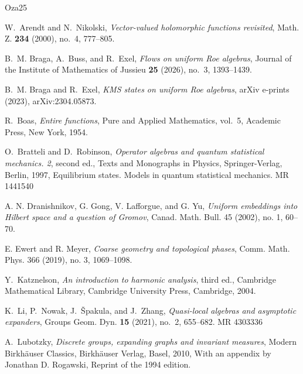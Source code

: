 \documentclass[11pt]{amsart}
\numberwithin{equation}{section}
\theoremstyle{definition}
\theoremstyle{remark}
\begin{document}
\providecommand{\bysame}{\leavevmode\hbox to3em{\hrulefill}\thinspace}
\providecommand{\MR}{\relax\ifhmode\unskip\space\fi MR }
\providecommand{\MRhref}[2]{%
  \href{http://www.ams.org/mathscinet-getitem?mr=#1}{#2}
}
\providecommand{\href}[2]{#2}
\begin{thebibliography}{{Oza}25}

W.~Arendt and N.~Nikolski, \emph{Vector-valued holomorphic functions
  revisited}, Math. Z. \textbf{234} (2000), no.~4, 777--805.

B.~M. Braga, A.~Buss, and R.~Exel, \emph{Flows on uniform {R}oe algebras},
  Journal of the Institute of Mathematics of Jussieu \textbf{25} (2026), no.~3,
  1393--1439.

B.~M. {Braga} and R.~{Exel}, \emph{{KMS states on uniform Roe algebras}}, arXiv
  e-prints (2023), arXiv:2304.05873.

R.~Boas, \emph{Entire functions}, Pure and Applied Mathematics, vol.~5,
  Academic Press, New York, 1954.

O.~Bratteli and D.~Robinson, \emph{Operator algebras and quantum statistical
  mechanics. 2}, second ed., Texts and Monographs in Physics, Springer-Verlag,
  Berlin, 1997, Equilibrium states. Models in quantum statistical mechanics.
  \MR{1441540}

A. N. Dranishnikov, G. Gong, V. Lafforgue, and G. Yu, \emph{Uniform embeddings
into Hilbert space and a question of Gromov},   Canad. Math. Bull. 45 (2002),
no. 1, 60–70.

E. Ewert and R. Meyer, \emph{Coarse geometry and topological phases}, Comm. Math.
Phys. 366 (2019), no. 3, 1069–1098.

Y.~Katznelson, \emph{An introduction to harmonic analysis}, third ed.,
  Cambridge Mathematical Library, Cambridge University Press, Cambridge, 2004.

K.~Li, P.~Nowak, J.~{\v{S}}pakula, and J.~Zhang, \emph{Quasi-local algebras and
  asymptotic expanders}, Groups Geom. Dyn. \textbf{15} (2021), no.~2, 655--682.
  \MR{4303336}

A.~Lubotzky, \emph{Discrete groups, expanding graphs and invariant measures},
  Modern Birkh\"{a}user Classics, Birkh\"{a}user Verlag, Basel, 2010, With an
  appendix by Jonathan D. Rogawski, Reprint of the 1994 edition.


\end{thebibliography}
\end{document}
